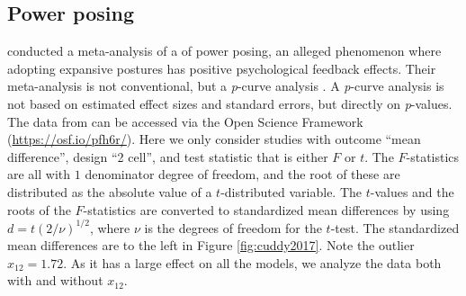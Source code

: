 \documentclass[useAMS,usenatbib,referee]{biom}
\renewcommand{\sqrt}[1]{(#1)^{1/2}}
\begin{document}
\subsection{Power posing\label{subsec:cuddy2018}}

\citet{cuddy2018p} conducted a meta-analysis of a of power posing, an alleged phenomenon where adopting expansive postures has positive psychological feedback effects. Their meta-analysis is not conventional, but a \textit{p}-curve analysis \citep{simonsohn2014p}. A \textit{p}-curve analysis is not based on estimated effect sizes and standard errors, but directly on \textit{p}-values. The data from \citet{cuddy2018p} can be accessed via the Open Science Framework (\url{https://osf.io/pfh6r/}). Here we only consider studies with outcome \enquote{mean difference}, design \enquote{2 cell}, and test statistic that is either $F$ or $t$. The $F$-statistics are all with $1$ denominator degree of freedom, and the root of these are distributed as the absolute value of a $t$-distributed variable. The $t$-values and the roots of the $F$-statistics are converted to standardized mean differences by using $d = t\sqrt{2/\nu}$, where $\nu$ is the degrees of freedom for the $t$-test. The standardized mean differences are to the left in Figure \ref{fig:cuddy2017}. Note the outlier $x_{12} = 1.72$. As it has a large effect on all the models, we analyze the data both with and without $x_{12}$.
\end{document}
